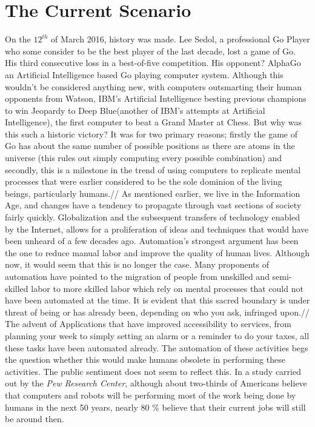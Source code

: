 \section{The Current Scenario}
\label{sec:-current}
On the $12^{th}$ of March 2016, history was made. Lee Sedol, a professional Go Player who some consider to be the best player of the last decade, lost a game of Go. His third consecutive loss in a best-of-five competition. His opponent? AlphaGo an Artificial Intelligence based Go playing computer system. Although this wouldn't be considered anything new, with computers outsmarting their human opponents from Watson, IBM's Artificial Intelligence besting previous champions to win Jeopardy to Deep Blue(another of IBM's attempts at Artificial Intelligence), the first computer to beat a Grand Master at Chess. But why was this such a historic victory? It was for two primary reasons; firstly the game of Go has about the same number of possible positions as there are atoms in the universe (this rules out simply computing every possible combination) and secondly, this is a milestone in the trend of using computers to replicate mental processes that were earlier considered to be the sole dominion of the living beings, particularly humans.//
	As mentioned earlier, we live in the Information Age, and changes have a tendency to propagate through vast sections of society fairly quickly. Globalization and the subsequent transfers of technology enabled by the Internet, allows for a proliferation of ideas and techniques that would have been unheard of a few decades ago. Automation's strongest argument has been the one to reduce manual labor and improve the quality of human lives. Although now, it would seem that this is no longer the case. Many proponents of automation have pointed to the migration of people from unskilled and semi-skilled labor to more skilled labor which rely on mental processes that could not have been automated at the time. It is evident that this sacred boundary is under threat of being or has already been, depending on who you ask, infringed upon.//
	The advent of Applications that have improved accessibility to services, from planning your week to simply setting an alarm or a reminder to do your taxes, all these tasks have been automated already. The automation of these activities begs the question whether this would make humans obsolete in performing these activities. The public sentiment does not seem to reflect this. In a study carried out by the \textit{Pew Research Center}\cite{workforcepew}, although about two-thirds of Americans believe that computers and robots will be performing most of the work being done by humans in the next 50 years, nearly 80 \% believe that their current jobs will still be around then.\\

